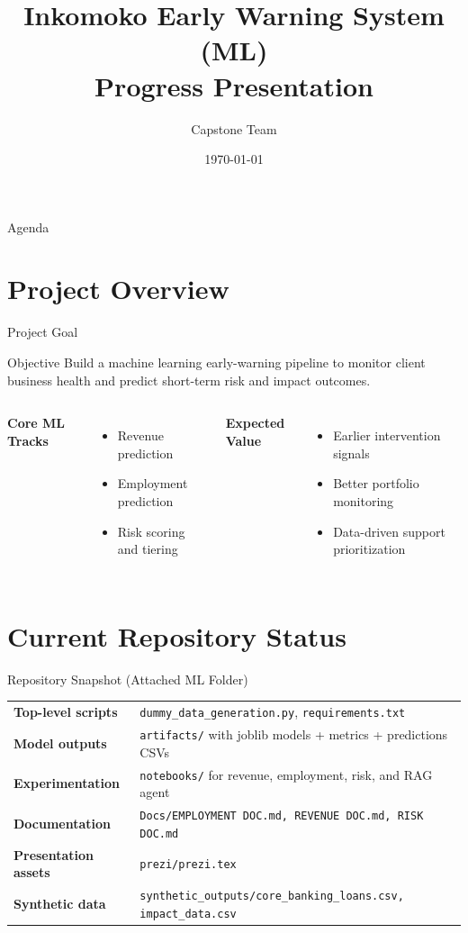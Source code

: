 \documentclass[10pt]{beamer}
\title{Inkomoko Early Warning System (ML)\\Progress Presentation}
\author{Capstone Team}
\institute{Semester 4 Simulations}
\date{\today}
\begin{document}
\begin{frame}
    \titlepage
\end{frame}

\begin{frame}{Agenda}
    \tableofcontents
\end{frame}

\section{Project Overview}

\begin{frame}{Project Goal}
\begin{block}{Objective}
Build a machine learning early-warning pipeline to monitor client business health and predict short-term risk and impact outcomes.
\end{block}

\begin{columns}[T]
\textbf{Core ML Tracks}
\begin{itemize}
    \item Revenue prediction
    \item Employment prediction
    \item Risk scoring and tiering
\end{itemize}

\textbf{Expected Value}
\begin{itemize}
    \item Earlier intervention signals
    \item Better portfolio monitoring
    \item Data-driven support prioritization
\end{itemize}
\end{columns}
\end{frame}

\section{Current Repository Status}

\begin{frame}{Repository Snapshot (Attached ML Folder)}
\small
\begin{tabularx}{\textwidth}{>{\bfseries}l X}
Top-level scripts & \texttt{dummy\_data\_generation.py}, \texttt{requirements.txt} \\
Model outputs & \texttt{artifacts/} with joblib models + metrics + predictions CSVs \\
Experimentation & \texttt{notebooks/} for revenue, employment, risk, and RAG agent \\
Documentation & \texttt{Docs/EMPLOYMENT DOC.md, REVENUE DOC.md, RISK DOC.md} \\
Presentation assets & \texttt{prezi/prezi.tex} \\
Synthetic data & \texttt{synthetic\_outputs/core\_banking\_loans.csv, impact\_data.csv}
\end{tabularx}
\end{frame}
\end{document}
